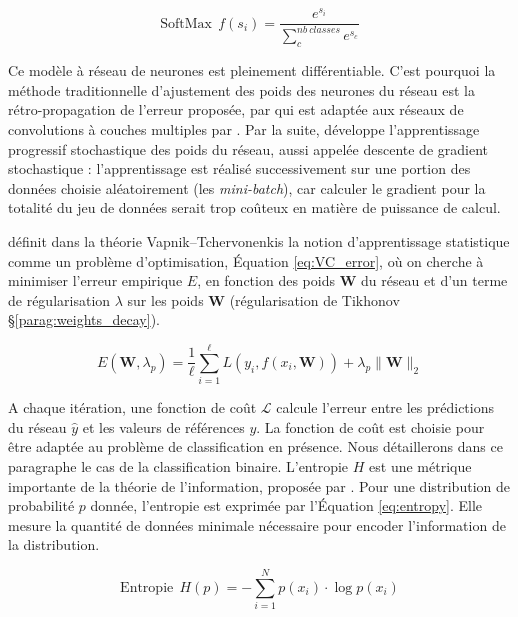 \begin{equation} \label{eq:softmax}
\text{SoftMax} \ \ f(s_{i})=\frac{e^{s_{i}}}{\sum_{c}^{nb \ classes} e^{s_{c}}}
\end{equation}


Ce modèle à réseau de neurones est pleinement différentiable. C'est pourquoi la méthode traditionnelle d'ajustement des poids des neurones du réseau est la rétro-propagation de l'erreur proposée, par \cite{rumelhart_learning_1985} qui est adaptée aux réseaux de convolutions à couches multiples par \cite{lecun_backpropagation_1989}.
Par la suite, \cite{lecun_efficient_1998} développe l'apprentissage progressif stochastique des poids du réseau, aussi appelée descente de gradient stochastique : l'apprentissage est réalisé successivement sur une portion des données choisie aléatoirement  (les \textit{mini-batch}), car  calculer le gradient pour la totalité du jeu de données serait trop coûteux en matière de puissance de calcul.

\cite{vapnik_principles_1992} définit dans la théorie Vapnik–Tchervonenkis la notion d'apprentissage statistique comme un problème d'optimisation, Équation \ref{eq:VC_error}, où on cherche à minimiser l'erreur empirique $E$, en fonction des poids $\mathbf{W}$ du réseau et d'un terme de régularisation $\lambda$ sur les poids $\mathbf{W}$ (régularisation de Tikhonov §\ref{parag:weights_decay}).

\begin{equation} \label{eq:VC_error}
E\left(\mathbf{W}, \lambda_{p}\right)=\frac{1}{\ell} \sum_{i=1}^{\ell} L\left(y_{i}, f\left(x_{i}, \mathbf{W}\right)\right)+\lambda_{p}\|\mathbf{W}\|_{2}
\end{equation}

A chaque itération, une fonction de coût $\mathcal{L}$ calcule l'erreur entre les prédictions du réseau $\hat{y}$ et les valeurs de références $y$.
La fonction de coût est choisie pour être adaptée au problème de classification en présence.
Nous détaillerons dans ce paragraphe le cas de la classification binaire.
L'entropie $H$ est une métrique importante de la théorie de l'information, proposée par \cite{shannon_mathematical_1948}.
Pour une distribution de probabilité $p$ donnée, l'entropie est exprimée par l'Équation \ref{eq:entropy}.
Elle mesure la quantité de données minimale nécessaire pour encoder l'information de la distribution.

\begin{equation} \label{eq:entropy}
\text{Entropie} \ \ H(p) =-\sum_{i=1}^{N} p\left(x_{i}\right) \cdot \log p\left(x_{i}\right)
\end{equation}

